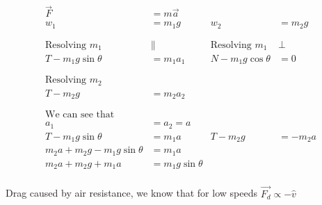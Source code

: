 \documentclass[12pt]{article}
\begin{document}
\begin{align*}
	\overrightarrow{F}                 & = m \overrightarrow{a}                                     \\
	w_1                                & = m_1 g                & w_2                    & = m_2 g  \\
	\phantom{=}                                                                                     \\
	\text{Resolving } m_1              & \parallel              & \text{Resolving } m_1  & \perp    \\
	T - m_1 g \sin{\theta}             & = m_1 a_1              & N - m_1 g \cos{\theta} & = 0      \\
	\phantom{=}                                                                                     \\
	\text{Resolving } m_2              &                                                            \\
	T - m_2 g                          & = m_2 a_2                                                  \\
	\phantom{=}                                                                                     \\
	\text{We can see that}                                                                          \\
	a_1                                & = a_2 = a                                                  \\
	T - m_1 g \sin{\theta}             & = m_1 a                & T - m_2 g              & = -m_2 a \\
	m_2 a + m_2 g - m_1 g \sin{\theta} & = m_1 a                                                    \\
	m_2 a + m_2 g + m_1 a              & = m_1 g \sin{\theta}                                       \\
\end{align*}

Drag caused by air resistance, we know that for low speeds $\overrightarrow{F_d} \propto - \hat{v}$
\end{document}
